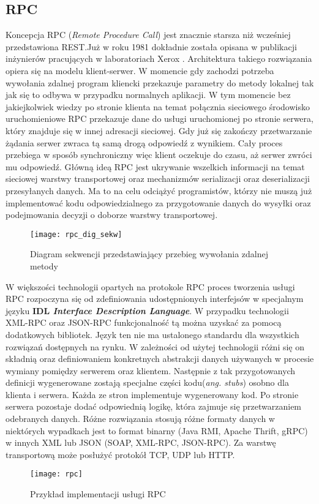\subsection{RPC}
Koncepcja RPC (\textit{Remote Procedure Call}) jest znacznie starsza niż wcześniej przedstawiona REST.\@ Już w roku 1981 dokładnie została opisana w publikacji inżynierów pracujących w laboratoriach Xerox \cite{nelson1981remote}. Architektura takiego rozwiązania opiera się na modelu klient-serwer. W momencie gdy zachodzi potrzeba wywołania zdalnej program kliencki przekazuje parametry do metody lokalnej tak jak się to odbywa w przypadku normalnych aplikacji. W tym momencie bez jakiejkolwiek wiedzy po stronie klienta na temat połącznia sieciowego środowisko uruchomieniowe RPC przekazuje dane do usługi uruchomionej po stronie serwera, który znajduje się w innej adresacji sieciowej. Gdy już się zakończy przetwarzanie żądania serwer zwraca tą samą drogą odpowiedź z wynikiem. Cały proces przebiega w sposób synchroniczny więc klient oczekuje do czasu, aż serwer zwróci mu odpowiedź. Główną ideą RPC jest ukrywanie wszelkich informacji na temat sieciowej warstwy transportowej oraz mechanizmów serializacji oraz deserializacji przesyłanych danych. Ma to na celu odciążyć programistów, którzy nie muszą już implementować kodu odpowiedzialnego za przygotowanie danych do wysyłki oraz podejmowania decyzji o doborze warstwy transportowej.
\begin{figure}[h!]
    \caption{Diagram sekwencji przedstawiający przebieg wywołania zdalnej metody}
    \texttt{[image: rpc\_dig\_sekw]}
    \centering
\end{figure} 
\par W większości technologii opartych na protokole RPC proces tworzenia usługi RPC rozpoczyna się od zdefiniowania udostępnionych interfejsów w specjalnym języku \textbf{IDL \textit{Interface Description Language}}. W przypadku technologii XML-RPC oraz JSON-RPC funkcjonalność tą można uzyskać za pomocą dodatkowych bibliotek. Język ten nie ma ustalonego standardu dla wszystkich rozwiązań dostępnych na rynku. W zależności od użytej technologii różni się on składnią oraz definiowaniem konkretnych abstrakcji danych używanych w procesie wymiany pomiędzy serwerem oraz klientem. Następnie z tak przygotowanych definicji wygenerowane zostają specjalne części kodu(\textit{ang. stubs}) osobno dla klienta i serwera. Każda ze stron implementuje wygenerowany kod. Po stronie serwera pozostaje dodać odpowiednią logikę, która zajmuje się przetwarzaniem odebranych danych. Różne rozwiązania stosują różne formaty danych w niektórych wypadkach jest to format binarny (Java RMI, Apache Thrift, gRPC) w innych XML lub JSON (SOAP, XML-RPC, JSON-RPC). Za warstwę transportową może posłużyć protokół TCP, UDP lub HTTP\@.
\begin{figure}[h!]
    \caption{Przykład implementacji usługi RPC}
    \texttt{[image: rpc]}
    \centering
\end{figure}
